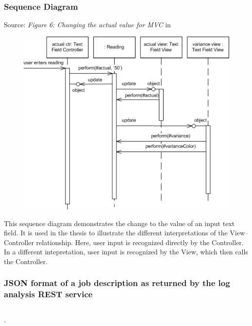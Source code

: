 \subsubsection*{Sequence Diagram}
\label{app:diagram}
Source: \textit{Figure 6: Changing the actual value for MVC} in \cite{fowlergui}

\begin{figure}[H]
	\centering
	\includegraphics[width=12cm]{images/mvc-seq.png}
\end{figure}

This sequence diagram demonstrates the change to the value of an input text field. It is used in the thesis to illustrate the different interpretations of the View--Controller relationship. Here, user input is recognized directly by the Controller. In a different intepretation, user input is recognized by the View, which then calls the Controller.

\newpage
\subsubsection*{JSON format of a job description as returned by the log analysis REST service}
\label{app:json}
\inputminted[tabsize=2,linenos]{javascript}{info.json}.